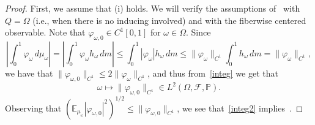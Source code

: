 \documentclass[12pt,reqno,a4paper]{article}
\begin{document}
	\begin{proof} First, we assume that (i) holds.
		We will verify the assumptions of~\cite[Theorem 2.3.]{K} with $Q=\Omega$ (i.e., when there is no inducing involved) and with the fiberwise centered observable.
		Note that $\varphi_{\omega, 0} \in C^1[0, 1]$ for $\omega \in \Omega$.
		Since 
		\[
		\left |\int_0^1\varphi_\omega  \, d\mu_\omega\right |=\left | \int_0^1\varphi_\omega h_\omega \, dm \right |\le \int_0^1|\varphi_\omega| h_\omega \, dm\le \|\varphi_\omega \|_{C^1}\int_0^1h_\omega \, dm=\|\varphi_\omega\|_{C^1},
		\]
		we have that $\|\varphi_{\omega, 0}\|_{C^1}\le 2\|\varphi_\omega \|_{C^1}$, and thus from~\eqref{integ} we get that 
		\begin{equation}\label{integ2}
			\omega \mapsto \|\varphi_{\omega, 0}\|_{C^1} \in L^2(\Omega, \mathcal F, \mathbb P).
		\end{equation}
		Observing that $(\mathbb E_{\mu_\omega}|\varphi_{\omega, 0}|^2)^{1/2}\le \|\varphi_{\omega, 0}\|_{C^1}$, we see that~\eqref{integ2} implies~\cite[(2.7)]{K}.
		

\end{proof}
\end{document}
